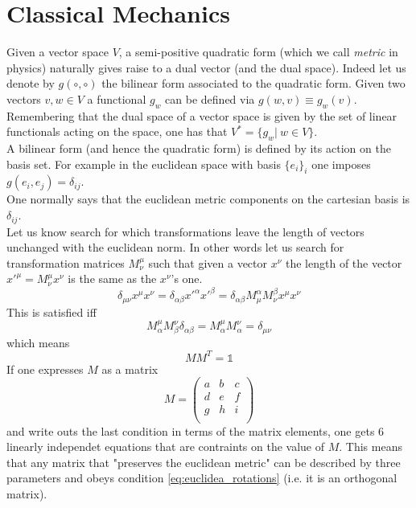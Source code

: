 \documentclass{article}
\begin{document}
\section*{Classical Mechanics}
Given a vector space $V$, a semi-positive quadratic form (which we call \emph{metric} in physics) naturally gives raise to a dual vector (and the dual space). Indeed let us 
denote by $g(\circ, \circ)$ the bilinear form associated to the quadratic form. Given two vectors $v,w \in V$ a functional $g_w$ can be defined via $g(w,v) \equiv g_w(v)$. \\ 
Remembering that the dual space of a vector space is given by the set of linear functionals acting on the space, one has that $V^* = \{g_w | \ w \in V\}$. \\
A bilinear form (and hence the quadratic form) is defined by its action on the basis set. For example in the euclidean space with basis $\{e_i\}_{i}$ one imposes $g(e_i, e_j) = \delta_{ij}$. \\
One normally says that the euclidean metric components on  the cartesian basis is $\delta_{ij}$. \\
Let us know search for which transformations leave the length of vectors unchanged with the euclidean norm. 
In other words let us search for transformation matrices $M^{\mu}_{\nu}$ such that  given a vector $x^\nu$ the length of the vector $x'^{\mu} = M^{\mu}_\nu x^\nu$ is the same as the $x^\nu$'s one.
\begin{equation*}
    \delta_{\mu \nu} x^\mu x^\nu = \delta_{\alpha \beta} x'^\alpha x'^\beta = \delta_{\alpha \beta} M^\alpha_\mu M^\beta_\nu x^\mu x^\nu
\end{equation*}
This is satisfied iff
\begin{equation*}
    M^\mu_\alpha M^\nu_\beta \delta_{\alpha\beta} = M^\mu_\alpha M^\nu_\alpha = \delta_{\mu\nu}
\end{equation*}
which means 
\begin{equation}
    MM^T = \mathds{1}
    \label{eq:euclidea_rotations}
\end{equation}
If one expresses $M$ as a matrix 
\begin{equation*}
    M = \begin{pmatrix}
        a & b & c \\
        d & e & f \\
        g & h & i \\
    \end{pmatrix}
\end{equation*}
and write outs the last condition in terms of the matrix elements, one gets 6 linearly independet equations that are contraints on the value of $M$. This means that any matrix that "preserves the euclidean metric" can be described by three parameters and obeys condition \ref{eq:euclidea_rotations} (i.e. it is an orthogonal matrix). \\
\end{document}
